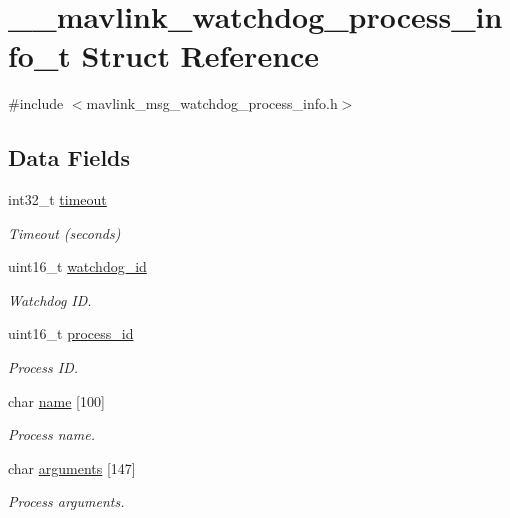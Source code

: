 \hypertarget{struct____mavlink__watchdog__process__info__t}{\section{\+\_\+\+\_\+mavlink\+\_\+watchdog\+\_\+process\+\_\+info\+\_\+t Struct Reference}
\label{struct____mavlink__watchdog__process__info__t}
}


{\ttfamily \#include $<$mavlink\+\_\+msg\+\_\+watchdog\+\_\+process\+\_\+info.\+h$>$}

\subsection*{Data Fields}
\begin{DoxyCompactItemize}
\item 
int32\+\_\+t \hyperlink{struct____mavlink__watchdog__process__info__t_a55a9ddc8f87f75193de2146ae371e132}{timeout}
\begin{DoxyCompactList}\small\item\em Timeout (seconds) \end{DoxyCompactList}\item 
uint16\+\_\+t \hyperlink{struct____mavlink__watchdog__process__info__t_a626eb0598a339dfd38c45046e5dcbe9b}{watchdog\+\_\+id}
\begin{DoxyCompactList}\small\item\em Watchdog I\+D. \end{DoxyCompactList}\item 
uint16\+\_\+t \hyperlink{struct____mavlink__watchdog__process__info__t_a0d916f536a67f05cc9763728873d82b5}{process\+\_\+id}
\begin{DoxyCompactList}\small\item\em Process I\+D. \end{DoxyCompactList}\item 
char \hyperlink{struct____mavlink__watchdog__process__info__t_ad47b2f22f2be391a9a5b30b3c5e13bca}{name} \mbox{[}100\mbox{]}
\begin{DoxyCompactList}\small\item\em Process name. \end{DoxyCompactList}\item 
char \hyperlink{struct____mavlink__watchdog__process__info__t_a91ed4075aa393c547c63848dd45718e1}{arguments} \mbox{[}147\mbox{]}
\begin{DoxyCompactList}\small\item\em Process arguments. \end{DoxyCompactList}\end{DoxyCompactItemize}


